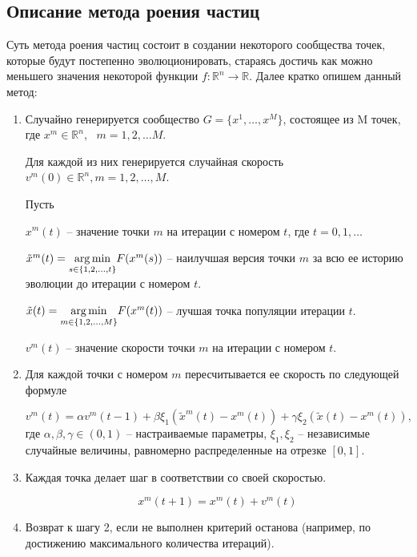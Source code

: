 \documentclass[../main.tex]{subfiles}
\begin{document}
	\subsection{Описание метода роения частиц}
	
	Суть метода роения частиц состоит в создании некоторого сообщества точек, которые будут постепенно эволюционировать, стараясь достичь как можно меньшего значения некоторой функции $f: \mathbb{R}^n \rightarrow \mathbb{R}$. Далее кратко опишем данный метод:
	
	\begin{enumerate}
		\item Случайно генерируется сообщество $G = \{x^1, \dots, x^M\}$, состоящее из M точек, где $x^m \in \mathbb{R}^n, \text{ } m = 1, 2, \dots M$. 
		
		Для каждой из них генерируется случайная скорость $v^m(0) \in \mathbb{R}^n, m=1, 2, \dots, M$.
		
		Пусть
		
		$x^m(t)$ -- значение точки $m$  на итерации с номером $t$, где $t = 0, 1, \dots$
		
		$\tilde{x}^m(t) = \underset{s \in \{1, 2, \dots, t\}}{\operatorname*{arg\,min}} F(x^m(s))$ -- наилучшая версия точки $m$ за всю ее историю эволюции до итерации с номером $t$.
		
		$\tilde{x}(t) = \underset{m \in \{1, 2, \dots, M\}}{\operatorname*{arg\,min}} F(x^m(t))$ -- лучшая точка популяции итерации $t$.
		
		$v^m(t)$ -- значение скорости точки $m$ на итерации с номером $t$.
		
		\item Для каждой точки с номером $m$ пересчитывается ее скорость по следующей формуле
		
		\[ v^m(t) = \alpha v^m(t - 1) + \beta \xi_1(\tilde{x}^m(t) - x^m(t)) + \gamma \xi_2(\tilde{x}(t) - x^m(t)), \]
		где $\alpha, \beta, \gamma \in (0, 1)$ -- настраиваемые параметры, $\xi_1, \xi_2$ -- независимые случайные величины, равномерно распределенные на отрезке $[0, 1]$.
		
		\item Каждая точка делает шаг в соответствии со своей скоростью.
		
		\[ x^m(t+1) = x^m(t) + v^m(t)\]
		
		\item Возврат к шагу 2, если не выполнен критерий останова (например, по достижению максимального количества итераций).
		
	\end{enumerate}
	
\end{document}
